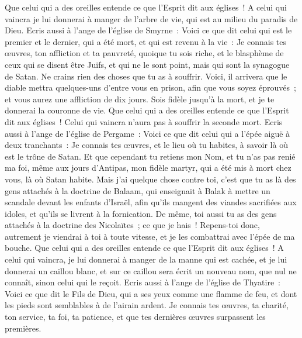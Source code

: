 \begin{multicols}{2}
Que celui qui a des oreilles entende ce que l'Esprit dit aux églises~! A celui qui vaincra je lui donnerai à manger de l'arbre de vie, qui est au milieu du paradis de Dieu.
Ecris aussi à l'ange de l'église de Smyrne~: Voici ce que dit celui qui est le premier et le dernier, qui a été mort, et qui est revenu à la vie~:
Je connais tes œuvres, ton affliction et ta pauvreté, quoique tu sois riche, et le blasphème de ceux qui se disent être Juifs, et qui ne le sont point, mais qui sont la synagogue de Satan.
Ne crains rien des choses que tu as à souffrir. Voici, il arrivera que le diable mettra quelques-uns d'entre vous en prison, afin que vous soyez éprouvés~; et vous aurez une affliction de dix jours. Sois fidèle jusqu'à la mort, et je te donnerai la couronne de vie.
Que celui qui a des oreilles entende ce que l'Esprit dit aux églises~! Celui qui vaincra n'aura pas à souffrir la seconde mort.
Ecris aussi à l'ange de l'église de Pergame~: Voici ce que dit celui qui a l'épée aiguë à deux tranchants~: 
Je connais tes œuvres, et le lieu où tu habites, à savoir là où est le trône de Satan. Et que cependant tu retiens mon Nom, et tu n'as pas renié ma foi, même aux jours d'Antipas, mon fidèle martyr, qui a été mis à mort chez vous, là où Satan habite.
Mais j'ai quelque chose contre toi, c'est que tu as là des gens attachés à la doctrine de Balaam, qui enseignait à Balak à mettre un scandale devant les enfants d'Israël, afin qu'ils mangent des viandes sacrifiées aux idoles, et qu'ils se livrent à la fornication.
De même, toi aussi tu as des gens attachés à la doctrine des Nicolaïtes~; ce que je hais~!
Repens-toi donc, autrement je viendrai à toi à toute vitesse, et je les combattrai avec l'épée de ma bouche.
Que celui qui a des oreilles entende ce que l'Esprit dit aux églises~! A celui qui vaincra, je lui donnerai à manger de la manne qui est cachée, et je lui donnerai un caillou blanc, et sur ce caillou sera écrit un nouveau nom, que nul ne connaît, sinon celui qui le reçoit.
Ecris aussi à l'ange de l'église de Thyatire~: Voici ce que dit le Fils de Dieu, qui a ses yeux comme une flamme de feu, et dont les pieds sont semblables à de l'airain ardent.
Je connais tes œuvres, ta charité, ton service, ta foi, ta patience, et que tes dernières œuvres surpassent les premières.

\end{multicols}
